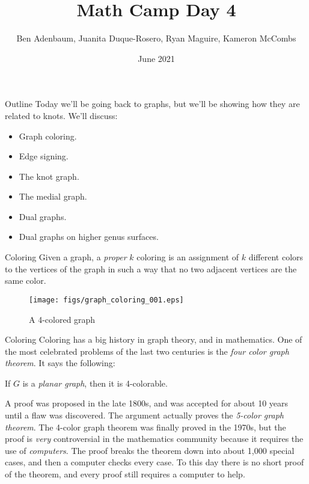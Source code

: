 \documentclass{beamer}
\title{Math Camp Day 4}
\author{Ben Adenbaum, Juanita Duque-Rosero, Ryan Maguire, Kameron McCombs}
\date{June 2021}
\begin{document}
    \maketitle
    \begin{frame}{Outline}
        Today we'll be going back to graphs, but we'll be showing how they are related to knots.
        We'll discuss:
        \begin{itemize}
            \item Graph coloring.
            \item Edge signing.
            \item The knot graph.
            \item The medial graph.
            \item Dual graphs.
            \item Dual graphs on higher genus surfaces.
        \end{itemize}
    \end{frame}
    \begin{frame}{Coloring}
        Given a graph, a \textit{proper} $k$ coloring is an assignment of
        $k$ different colors to the vertices of the graph in such a way that no
        two adjacent vertices are the same color.
        \begin{figure}
            \centering
            \texttt{[image: figs/graph\_coloring\_001.eps]}
            \caption{A 4-colored graph}
            \label{fig:coloring_001}
        \end{figure}
    \end{frame}
    \begin{frame}{Coloring}
        Coloring has a big history in graph theory, and in mathematics. One
        of the most celebrated problems of the last two centuries is the
        \textit{four color graph theorem}. It says the following:
        \begin{theorem}
            If $G$ is a \textit{planar graph}, then it is 4-colorable.
        \end{theorem}
        A proof was proposed in the late 1800s, and was accepted for about 10 years
        until a flaw was discovered. The argument actually proves the \textit{5-color graph theorem}.
        The 4-color graph theorem was finally proved in the 1970s, but the proof is \textit{very}
        controversial in the mathematics community because it requires the use of
        \textit{computers}. The proof breaks the theorem down into about 1,000 special cases, and then
        a computer checks every case. To this day there is no short proof of the theorem, and every proof
        still requires a computer to help.
    \end{frame}
\end{document}
